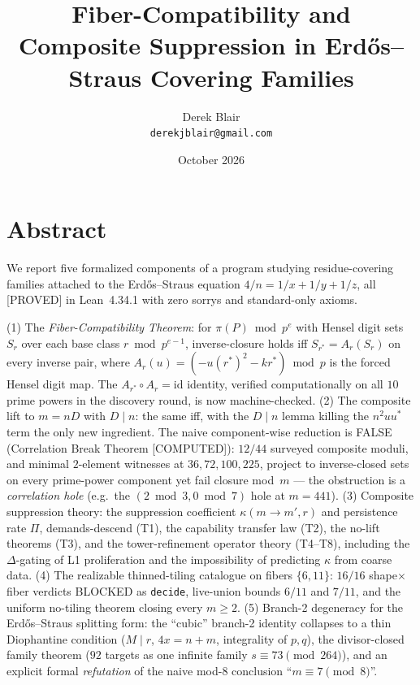 \documentclass[11pt,a4paper]{article}
\title{Fiber-Compatibility and Composite Suppression in
  Erd\H{o}s--Straus Covering Families}
\author{Derek Blair \\ \texttt{derekjblair@gmail.com}}
\date{October 2026}
\theoremstyle{definition}
\begin{document}
\maketitle

\section{Abstract}

We report five formalized components of a program studying residue-covering
families attached to the Erd\H{o}s--Straus equation
$4/n=1/x+1/y+1/z$, all [PROVED] in Lean~4.34.1 with zero sorrys and
standard-only axioms.

(1) The \emph{Fiber-Compatibility Theorem}: for $\pi(P)\bmod p^e$ with
Hensel digit sets $S_r$ over each base class $r\bmod p^{e-1}$,
inverse-closure holds iff $S_{r^*}=A_r(S_r)$ on every inverse pair, where
$A_r(u)=(-u(r^*)^2-kr^*)\bmod p$ is the forced Hensel digit map. The
$A_{r^*}\circ A_r=\mathrm{id}$ identity, verified computationally on all
$10$ prime powers in the discovery round, is now machine-checked.
(2) The composite lift to $m=nD$ with $D\mid n$: the same iff, with the
$D\mid n$ lemma killing the $n^2uu^*$ term the only new ingredient. The
naive component-wise reduction is FALSE (Correlation Break Theorem
[COMPUTED]): $12/44$ surveyed composite moduli, and minimal $2$-element
witnesses at $36,72,100,225$, project to inverse-closed sets on every
prime-power component yet fail closure mod~$m$ --- the obstruction is a
\emph{correlation hole} (e.g.\ the $(2\bmod3,0\bmod7)$ hole at $m=441$).
(3) Composite suppression theory: the suppression coefficient
$\kappa(m\to m',r)$ and persistence rate $\Pi$, demands-descend (T1),
the capability transfer law (T2), the no-lift theorems (T3), and the
tower-refinement operator theory (T4--T8), including the
$\Delta$-gating of L1 proliferation and the impossibility of predicting
$\kappa$ from coarse data.
(4) The realizable thinned-tiling catalogue on fibers $\{6,11\}$:
$16/16$ shape$\times$fiber verdicts BLOCKED as \texttt{decide}, live-union
bounds $6/11$ and $7/11$, and the uniform no-tiling theorem closing every
$m\ge2$.
(5) Branch-2 degeneracy for the Erd\H{o}s--Straus splitting form:
the ``cubic'' branch-2 identity collapses to a thin Diophantine
condition ($M\mid r$, $4x=n+m$, integrality of $p,q$), the divisor-closed
family theorem ($92$ targets as one infinite family
$s\equiv73\pmod{264}$), and an explicit formal \emph{refutation} of the
naive mod-$8$ conclusion ``$m\equiv7\pmod8$''.
\end{document}
